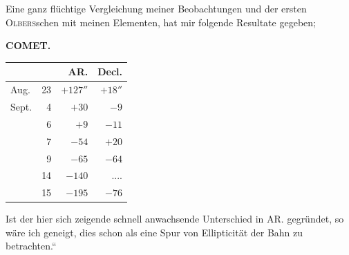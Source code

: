 \par\indent Eine ganz flüchtige Vergleichung meiner Beobachtungen und der ersten \textsc{Olbers}schen mit meinen Elementen, hat mir folgende Resultate gegeben;
\clearpage
\endgroup
\begingroup
\pagestyle{empty}
\newcommand{\GaussVICitation}[2]{%
  \begin{center}
  \parbox{#1\linewidth}{%
    \centering\footnotesize\frenchspacing
    \hrule height .3pt\relax\vspace{2.5pt}
    #2\par
    \vspace{2.5pt}\hrule height .3pt\relax
  }%
  \end{center}
  \par\nobreak\medskip
}
\newcommand{\GaussVIGathering}[2]{%
  \fancypagestyle{gaussVIGathering}{%
    \fancyhf{}%
    \renewcommand{\headrulewidth}{0pt}%
    \renewcommand{\footrulewidth}{0pt}%
    \fancyfoot[C]{\makebox[\textwidth][l]{%
      \hspace*{.025\textwidth}{\footnotesize\bfseries #1}\hfill
      {\normalsize\bfseries\textls[90]{#2}}\hspace*{.18\textwidth}}}%
  }%
  \thispagestyle{gaussVIGathering}%
}
\thispagestyle{empty}
\noindent{}%
\makebox[12mm][l]{}%
\parbox[t]{\dimexpr\linewidth-24mm\relax}{\centering\footnotesize\bfseries COMET.\par}%
\par\nobreak\medskip
\begin{center}\fontsize{10}{12}\selectfont\setlength{\tabcolsep}{7pt}\renewcommand{\arraystretch}{1.15}\begin{tabular}{lr|r|r}
 & & AR. & Decl.\\\hline
Aug. & 23 & $+127''$ & $+18''$\\
Sept. & 4 & $+30$ & $-9$\\
 & 6 & $+9$ & $-11$\\
 & 7 & $-54$ & $+20$\\
 & 9 & $-65$ & $-64$\\
 & 14 & $-140$ & .\;.\;.\;.\\
 & 15 & $-195$ & $-76$\\
\end{tabular}\end{center}

\par\indent Ist der hier sich zeigende schnell anwachsende Unterschied in AR. gegründet, so wäre ich geneigt, dies schon als eine Spur von Ellipticität der Bahn zu betrachten.“
